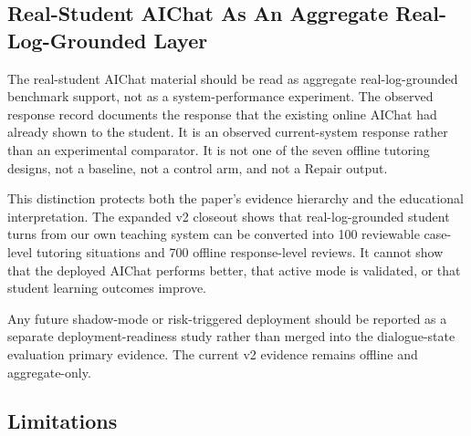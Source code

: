 \documentclass[11pt]{article}
\begin{document}
\subsection{Real-Student AIChat As An Aggregate Real-Log-Grounded Layer}

The real-student AIChat material should be read as aggregate real-log-grounded benchmark support, not as a system-performance experiment. The observed response record documents the response that the existing online AIChat had already shown to the student. It is an observed current-system response rather than an experimental comparator. It is not one of the seven offline tutoring designs, not a baseline, not a control arm, and not a Repair output.

This distinction protects both the paper's evidence hierarchy and the educational interpretation. The expanded v2 closeout shows that real-log-grounded student turns from our own teaching system can be converted into 100 reviewable case-level tutoring situations and 700 offline response-level reviews. It cannot show that the deployed AIChat performs better, that active mode is validated, or that student learning outcomes improve.

Any future shadow-mode or risk-triggered deployment should be reported as a separate deployment-readiness study rather than merged into the dialogue-state evaluation primary evidence. The current v2 evidence remains offline and aggregate-only.

\subsection{Limitations}
\end{document}
